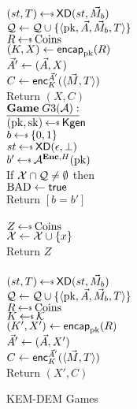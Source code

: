 \begin{figure}[tbhp]
\begin{center}
{\medskip
{}\\
$(st, T) \getsr \mdalg(st,\vmsg_b)$\\
$\mathcal{Q} \gets \mathcal{Q} \cup \{\langle \mathrm{pk},\vec{A},\vec{M}_b,T\rangle\}$\\
$R \getsr \mathrm{Coins}$\\
$(K,X) \gets \mathsf{encap}_{\mathrm{pk}}^{}(R)$\\
$\vec{A}' \gets (\vec{A}, X)$\\
$C \gets {\mathsf{enc}}_{K}^{\vec{A}'}(\langle \vec{M}, T\rangle)$\\
Return $(X,C)$\\
}
{
$\gamev{G3}{\advA}$\\
 $(\pk,\sk)\getsr\Kgen$\\
 $b \getsr \bits$ \\
 $st \getsr \mdalg(\epsilon,\bot)$\\
 $b' \getsr \advA^{\encOracle,H}(\pk)$\\
 If $\mathcal{X} \cap \mathcal{Q} \neq \emptyset$ then \\
\nudge $\mathrm{BAD}\gets\textsf{true}$\\
Return $[b=b']$\\ 

\medskip
{}\\
  $Z \getsr \mathrm{Coins}$\\
  $\mathcal{X} \gets \mathcal{X} \cup \{x\}$\\
  Return $Z$\\

\medskip
{}\\
$(st, T) \getsr \mdalg(st,\vmsg_b)$\\
$\mathcal{Q} \gets \mathcal{Q} \cup \{\langle \mathrm{pk},\vec{A},\vec{M}_b,T\rangle\}$\\
$R \getsr \mathrm{Coins}$\\
$K \getsr \kspace$\\
$(K',X') \gets \mathsf{encap}_{\mathrm{pk}}^{}(R)$\\
$\vec{A}' \gets (\vec{A}, X')$\\
$C \gets {\mathsf{enc}}_{K}^{\vec{A}'}(\langle \vec{M}, T\rangle)$\\
Return $(X',C)$\\
}
\caption{KEM-DEM Games}
\label{fig:CPA-KEMDEM}
\end{center}
\end{figure}

